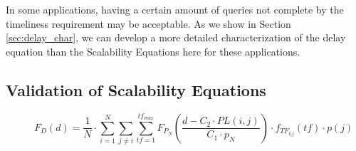 In some applications, having a certain amount of queries not complete by the timeliness requirement may be acceptable.  As we show in Section \ref{sec:delay_char}, we can develop a more detailed characterization of the delay equation than the Scalability Equations here for these applications. 

\subsection{Validation of Scalability Equations}
\label{sec:validation}

\begin{figure}[!t]
\setcounter{equation}{9}
\begin{equation}
\label{eq:full_delay_cdf}
	F_D(d) = \frac{1}{N} \cdot \sum\limits_{i = 1}^N \sum\limits_{j \neq i} \sum\limits_{tf=1}^{tf_{max}}  F_{P_N}( \frac{d - C_2 \cdot PL(i,j)}{C_1 \cdot p_N} ) \cdot f_{TF_{i | j}}( tf ) \cdot p(j)
\end{equation}
\end{figure}
\setcounter{equation}{5}


